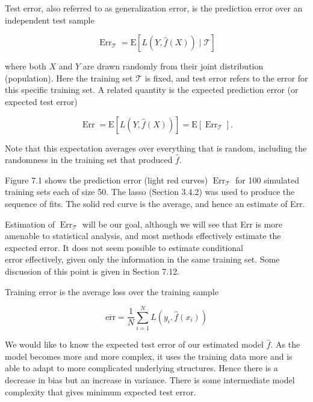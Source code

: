 \documentclass[10pt]{article}
\begin{document}
Test error, also referred to as generalization error, is the prediction error over an independent test sample


\begin{equation*}
\operatorname{Err}_{\mathcal{T}}=\mathrm{E}[L(Y, \hat{f}(X)) \mid \mathcal{T}] \tag{7.2}
\end{equation*}


where both $X$ and $Y$ are drawn randomly from their joint distribution (population). Here the training set $\mathcal{T}$ is fixed, and test error refers to the error for this specific training set. A related quantity is the expected prediction error (or expected test error)


\begin{equation*}
\operatorname{Err}=\mathrm{E}[L(Y, \hat{f}(X))]=\mathrm{E}\left[\operatorname{Err}_{\mathcal{T}}\right] . \tag{7.3}
\end{equation*}


Note that this expectation averages over everything that is random, including the randomness in the training set that produced $\hat{f}$.

Figure 7.1 shows the prediction error (light red curves) $\operatorname{Err}_{\mathcal{T}}$ for 100 simulated training sets each of size 50. The lasso (Section 3.4.2) was used to produce the sequence of fits. The solid red curve is the average, and hence an estimate of Err.

Estimation of $\operatorname{Err}_{\mathcal{T}}$ will be our goal, although we will see that Err is more amenable to statistical analysis, and most methods effectively estimate the expected error. It does not seem possible to estimate conditional\\
error effectively, given only the information in the same training set. Some discussion of this point is given in Section 7.12.

Training error is the average loss over the training sample


\begin{equation*}
\overline{\mathrm{err}}=\frac{1}{N} \sum_{i=1}^{N} L\left(y_{i}, \hat{f}\left(x_{i}\right)\right) \tag{7.4}
\end{equation*}


We would like to know the expected test error of our estimated model $\hat{f}$. As the model becomes more and more complex, it uses the training data more and is able to adapt to more complicated underlying structures. Hence there is a decrease in bias but an increase in variance. There is some intermediate model complexity that gives minimum expected test error.
\end{document}
